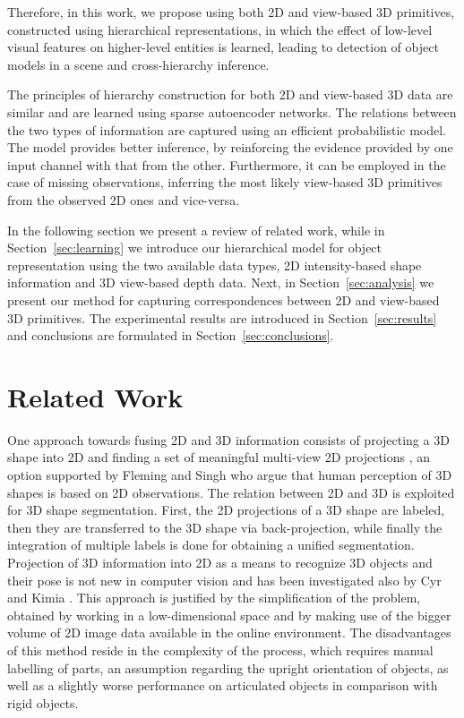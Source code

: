 \documentclass[runningheads]{llncs}
\begin{document}
Therefore, in this work, we propose using both 2D and view-based 3D primitives, constructed using hierarchical representations, in which the effect of low-level visual features on higher-level entities is learned, leading to detection of object models in a scene and cross-hierarchy inference. 

The principles of hierarchy construction for both 2D and view-based 3D data are similar and are learned using sparse autoencoder networks. The relations between the two types of information are captured using an efficient probabilistic model. The model provides better inference, by reinforcing the evidence provided by one input channel with that from the other. Furthermore, it can be employed in the case of missing observations, inferring the most likely view-based 3D primitives from the observed 2D ones and vice-versa. 

In the following section we present a review of related work, while in Section~\ref{sec:learning} we introduce our hierarchical model for object representation using the two available data types, 2D intensity-based shape information and 3D view-based depth data. Next, in Section~\ref{sec:analysis} we present our method for capturing correspondences between 2D and view-based 3D primitives. The experimental results are introduced in Section~\ref{sec:results} and conclusions are formulated in Section~\ref{sec:conclusions}.

\section{Related Work}
\label{sec:related_work}  

One approach towards fusing 2D and 3D information consists of projecting a 3D shape into 2D and finding a set of meaningful multi-view 2D projections \cite{WangGWC0C13}, an option supported by Fleming and Singh \cite{Fleming2009} who argue that human perception of 3D shapes is based on 2D observations. The relation between 2D and 3D is exploited for 3D shape segmentation. First, the 2D projections of a 3D shape are labeled, then they are transferred to the 3D shape via back-projection, while finally the integration of multiple labels is done for obtaining a unified segmentation. Projection of 3D information into 2D as a means to recognize 3D objects and their pose is not new in computer vision and has been investigated also by Cyr and Kimia \cite{Cyr2001}. This approach is justified by the simplification of the problem, obtained by working in a low-dimensional space and by making use of the bigger volume of 2D image data available in the online environment. The disadvantages of this method reside in the complexity of the process, which requires manual labelling of parts, an assumption regarding the upright orientation of objects, as well as a slightly worse performance on articulated objects in comparison with rigid objects.
\end{document}
